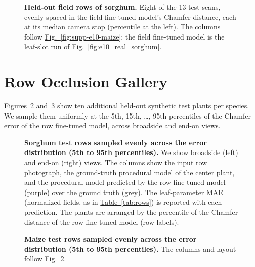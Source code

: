 \documentclass[10pt,twocolumn,letterpaper]{article}
\newcommand{\updtwo}[1]{#1}
\newcommand{\figref}[1]{\hyperref[#1]{Fig.~\ref*{#1}}}
\newcommand{\tabref}[1]{\hyperref[#1]{Table~\ref*{#1}}}
\begin{document}
\begin{figure}[t!]
  \centering
  \resizebox{\textwidth}{!}{}
  \caption{\updtwo{\textbf{Held-out field rows of sorghum.} Eight of the 13 test scans, evenly spaced in the field fine-tuned model's Chamfer distance, each at its median camera stop (percentile at the left). The columns follow \figref{fig:supp-e10-maize}; the field fine-tuned model is the leaf-slot run of \figref{fig:e10_real_sorghum}.}}
  \label{fig:supp-e10-sorghum}
\end{figure}


\FloatBarrier


\section{Row Occlusion Gallery}
\label{sec:supp-rows}

\textcolor{cvprblue}{Figures}~\ref{fig:supp-rows-sorghum} and~\ref{fig:supp-rows-maize} show ten additional held-out synthetic test plants per species. We sample them uniformly at the 5th, 15th, \dots, 95th percentiles of the Chamfer error of the row fine-tuned model, across broadside and end-on views.

\begin{figure}[t!]
  \centering
  \resizebox{0.95\linewidth}{!}{}
  \caption{\textbf{Sorghum test rows sampled evenly across the error distribution (5th to 95th percentiles).} We show broadside (left) and end-on (right) views. The columns show the input row photograph, the ground-truth procedural model of the center plant, and the procedural model predicted by the row fine-tuned model (purple) over the ground truth (grey). The leaf-parameter MAE (normalized fields, as in \tabref{tab:rows}) is reported with each prediction. The plants are arranged by the percentile of the Chamfer distance of the row fine-tuned model (row labels).}
  \label{fig:supp-rows-sorghum}
\end{figure}

\begin{figure}[t!]
  \centering
  \resizebox{0.99\linewidth}{!}{}
  \caption{\textbf{Maize test rows sampled evenly across the error distribution (5th to 95th percentiles).} The columns and layout follow \figref{fig:supp-rows-sorghum}.}
  \label{fig:supp-rows-maize}
\end{figure}
\end{document}
